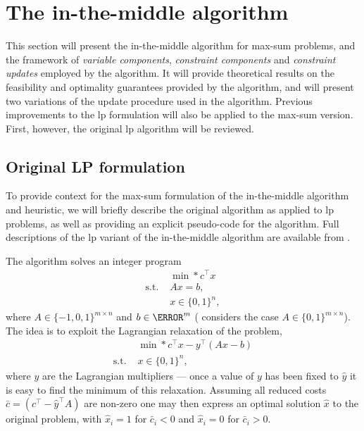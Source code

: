 \section{The in-the-middle algorithm}
This section will present the in-the-middle algorithm for max-sum problems, and the framework of \emph{variable components}, \emph{constraint components} and \emph{constraint updates} employed by the algorithm.
It will provide theoretical results on the feasibility and optimality guarantees provided by the algorithm, and will present two variations of the update procedure used in the algorithm.
Previous improvements to the \gls{lp} formulation will also be applied to the max-sum version.
First, however, the original \gls{lp} algorithm will be reviewed.

\subsection{Original LP formulation}
To provide context for the max-sum formulation of the in-the-middle algorithm and heuristic, we will briefly describe the original algorithm as applied to \gls{lp} problems, as well as providing an explicit pseudo-code for the algorithm.
Full descriptions of the \gls{lp} variant of the in-the-middle algorithm are available from \textcites{Wedelin95}{Bastert10}.

The algorithm solves an integer program
\begin{equation}\label{eq:ilp}
	\begin{aligned}
		{}           & \min*{c^\top x} \\
		\text{s.t. } & Ax = b, \\
		{}           & x \in \{0,1\}^n,
	\end{aligned}
\end{equation}
where \(A \in \{-1,0,1\}^{m\times n}\) and \(b\in\N^m\) (\textcite{Wedelin95} considers the case \(A \in \{0,1\}^{m\times n}\)).
The idea is to exploit the Lagrangian relaxation of the problem,
\begin{equation}\label{eq:ilp-lagrange}
	\begin{aligned}
		{}           & \min*{c^\top x - y^\top (Ax - b)}\\
		\text{s.t. } & x \in \{0,1\}^n,
	\end{aligned}
\end{equation}
where \(y\) are the Lagrangian multipliers --- once a value of \(y\) has been fixed to \(\hat{y}\) it is easy to find the minimum of this relaxation.
Assuming all reduced costs \(\bar{c} = (c^\top - \hat{y}^\top A)\) are non-zero one may then express an optimal solution \(\hat{x}\) to the original problem, with \(\hat{x}_i = 1\) for \(\bar{c}_i < 0\) and \(\hat{x}_i = 0\) for \(\bar{c}_i > 0\).

